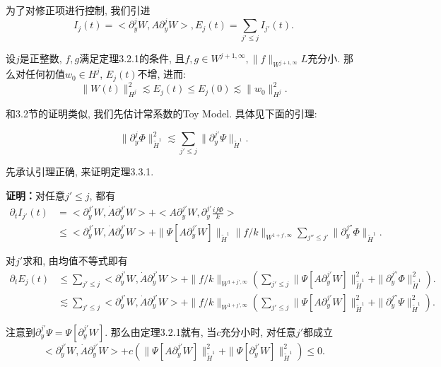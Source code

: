 为了对修正项进行控制, 我们引进
\begin{equation}
I_j(t)=<\partial_y^jW,A\partial_y^jW>, E_j(t)=\sum_{j'\leq j}I_{j'}(t).
\end{equation}

\begin{thm}\rm
\songti 设$j$是正整数, $f,g$满足定理3.2.1的条件, 且$f,g\in W^{j+1, \infty}, \|f\|_{W^{j+1,\infty}}L$充分小. 那么对任何初值$w_0\in H^j$, $E_j(t)$不增, 进而:
\begin{equation}
\|W(t)\|_{H^j}^2\lesssim E_j(t)\leq E_j(0)\lesssim \|w_0\|_{H^j}^2.
\end{equation}
\end{thm}

和3.2节的证明类似, 我们先估计常系数的Toy Model. 具体见下面的引理:

\begin{lem}\songti\rm
$$\|\partial_y^j\Phi\|_{\tilde{H}^1}^2\lesssim\sum_{j'\leq j}\|\partial_y^{j'}\Psi\|_{\tilde{H}^1}.$$
\end{lem}

先承认引理正确, 来证明定理3.3.1.

\textbf{证明：}对任意$j'\leq j$, 都有
\begin{equation}
\begin{aligned}
\partial_t I_{j'}(t)&=<\partial_y^{j'}W,\dot{A}\partial_y^{j'}W>+<A\partial_y^{j'}W,\partial_y^{j'}\frac{if\Phi}{k}> \\
&\leq <\partial_y^{j'}W,\dot{A}\partial_y^{j'}W>+\|\Psi[A\partial_y^{j'}W]\|_{\tilde{H}^1}\|f/k\|_{W^{1+j',\infty}}\sum_{j''\leq j'}\|\partial_y^{j''}\Phi\|_{\tilde{H}^1}.
\end{aligned}
\end{equation}

对$j'$求和, 由均值不等式即有
\begin{equation}
\begin{aligned}
\partial_t E_j(t)&\leq \sum_{j'\leq j}<\partial_y^{j'}W,\dot{A}\partial_y^{j'}W>+\|f/k\|_{W^{1+j',\infty}}(\sum_{j'\leq j}\|\Psi[A\partial_y^{j'}W]\|_{\tilde{H}^1}^2+\|\partial_y^{j''}\Phi\|_{\tilde{H}^1}^2). \\
&\lesssim\sum_{j'\leq j}<\partial_y^{j'}W,\dot{A}\partial_y^{j'}W>+\|f/k\|_{W^{1+j',\infty}}(\sum_{j'\leq j}\|\Psi[A\partial_y^{j'}W]\|_{\tilde{H}^1}^2+\|\partial_y^{j''}\Psi\|_{\tilde{H}^1}^2).
\end{aligned}
\end{equation}

注意到$\partial_y^{j'}\Psi=\Psi[\partial_y^{j'}W]$. 那么由定理3.2.1就有, 当$c$充分小时, 对任意$j'$都成立
\begin{equation}
<\partial_y^{j'}W,\dot{A}\partial_y^{j'}W>+c(\|\Psi[A\partial_y^{j'}W]\|_{\tilde{H}^1}^2+\|\Psi[\partial_y^{j'}W]\|_{\tilde{H}^1}^2)\leq 0.
\end{equation}

